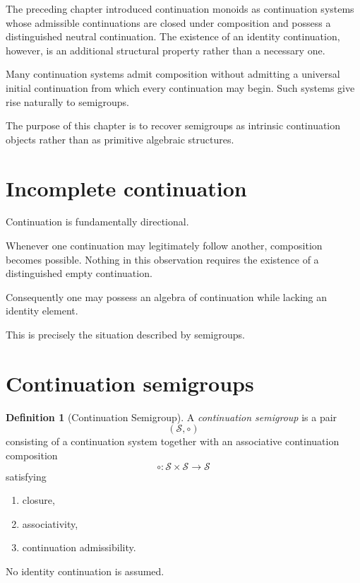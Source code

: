 \documentclass[13pt,openany]{book}
\theoremstyle{plain}
\theoremstyle{definition}
\newtheorem{definition}{Definition}[chapter]
\begin{document}
The preceding chapter introduced continuation monoids as continuation systems
whose admissible continuations are closed under composition and possess a
distinguished neutral continuation. The existence of an identity continuation,
however, is an additional structural property rather than a necessary one.

Many continuation systems admit composition without admitting a universal
initial continuation from which every continuation may begin. Such systems give
rise naturally to semigroups.

The purpose of this chapter is to recover semigroups as intrinsic continuation
objects rather than as primitive algebraic structures.

\section{Incomplete continuation}

Continuation is fundamentally directional.

Whenever one continuation may legitimately follow another, composition becomes
possible. Nothing in this observation requires the existence of a distinguished
empty continuation.

Consequently one may possess an algebra of continuation while lacking an
identity element.

This is precisely the situation described by semigroups.

\section{Continuation semigroups}

\begin{definition}[Continuation Semigroup]
A \emph{continuation semigroup} is a pair
\[
(\mathcal{S},\circ)
\]
consisting of a continuation system together with an associative continuation
composition
\[
\circ:\mathcal{S}\times\mathcal{S}\longrightarrow\mathcal{S}
\]
satisfying

\begin{enumerate}
\item closure,
\item associativity,
\item continuation admissibility.
\end{enumerate}

No identity continuation is assumed.
\end{definition}
\end{document}
